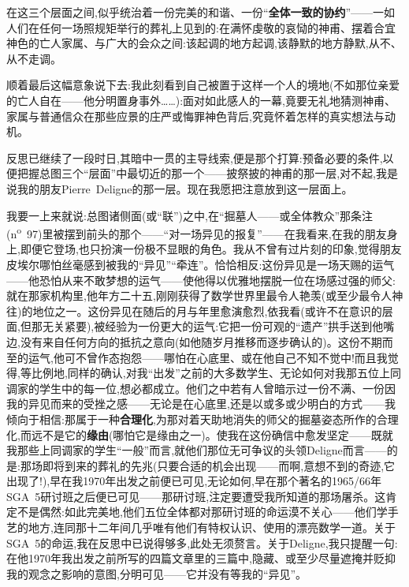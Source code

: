 \dmark{}在这三个层面之间,似乎统治着一份完美的和谐、一份“\textbf{全体一致的协约}”——一如人们在任何一场照规矩举行的葬礼上见到的:在满怀虔敬的哀恸的神甫、摆着合宜神色的亡人家属、与广大的会众之间:该起调的地方起调,该静默的地方静默,从不、从不走调。

顺着最后这幅意象说下去:我此刻看到自己被置于这样一个人的境地(不如那位亲爱的亡人自在——他分明置身事外……):面对如此感人的一幕,竟要无礼地猜测神甫、家属与普通信众在那些应景的庄严或悔罪神色背后,究竟怀着怎样的真实想法与动机。

反思已继续了一段时日,其暗中一贯的主导线索,便是那个打算:预备必要的条件,以便把握总图三个“层面”中最切近的那一个——披祭披的神甫的那一层,对不起,我是说我的朋友Pierre~Deligne的那一层。现在我愿把注意放到这一层面上。

我要一上来就说:总图诸侧面(或“联”)之中,在“掘墓人——或全体教众”那条注(n\textsuperscript{o}~97)里被摆到前头的那个——“对一场异见的报复”——在我看来,在我的朋友身上,即便它登场,也只扮演一份极不显眼的角色。我从不曾有过片刻的印象,觉得朋友皮埃尔哪怕丝毫感到被我的“异见”“牵连”。恰恰相反:这份异见是一场天赐的运气——他恐怕从来不敢梦想的运气——使他得以优雅地摆脱一位在场感过强的师父:就在那家机构里,他年方二十五,刚刚获得了数学世界里最令人艳羡(或至少最令人神往)的地位之一。这份异见在随后的月与年里愈演愈烈,依我看(或许不在意识的层面,但那无关紧要),被经验为一份更大的运气:它把一份可观的“遗产”拱手送到他嘴边,没有来自任何方向的抵抗之意向(如他随岁月推移而逐步确认的)。这份不期而至的运气,他可不曾作态\dmark{}抱怨——哪怕在心底里、或在他自己不知不觉中!而且我觉得,等比例地,同样的确认,对我“出发”之前的大多数学生、无论如何对我那五位上同调家的学生中的每一位,想必都成立。他们之中若有人曾暗示过一份不满、一份因我的异见而来的受挫之感——无论是在心底里,还是以或多或少明白的方式——我倾向于相信:那属于一种\textbf{合理化},为那对着天助地消失的师父的掘墓姿态所作的合理化,而远不是它的\textbf{缘由}(哪怕它是缘由之一)。使我在这份确信中愈发坚定——既就我那些上同调家的学生“一般”而言,就他们那位无可争议的头领Deligne而言——的是:那场即将到来的葬礼的先兆(只要合适的机会出现——而啊,意想不到的奇迹,它出现了!),早在我1970年出发之前便已可见,无论如何,早在那个著名的1965/66年SGA~5研讨班之后便已可见——那研讨班,注定要遭受我所知道的那场屠杀。这肯定不是偶然:如此完美地,他们五位全体都对那研讨班的命运漠不关心——他们学手艺的地方,连同那十二年间几乎唯有他们有特权认识、使用的漂亮数学一道。关于SGA~5的命运,我在反思中已说得够多,此处无须赘言。关于Deligne,我只提醒一句:在他1970年我出发之前所写的四篇文章里的三篇中,隐藏、或至少尽量遮掩并贬抑我的观念之影响的意图,分明可见——它并没有等我的“异见”。

